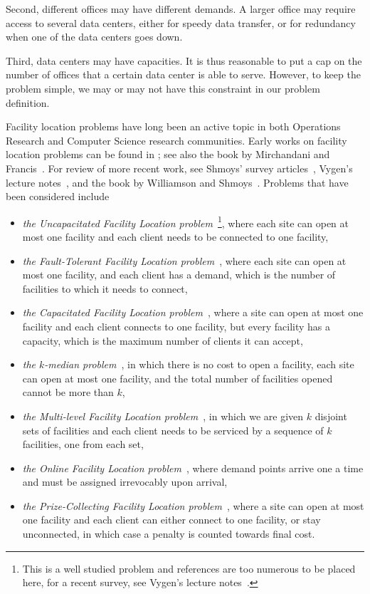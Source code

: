 \documentclass[oneside,final]{ucr}
\begin{document}
Second, different offices may have different demands. A
larger office may require access to several data centers,
either for speedy data transfer, or for redundancy when one
of the data centers goes down.

Third, data centers may have capacities. It is thus
reasonable to put a cap on the number of offices that a
certain data center is able to serve. However, to keep the
problem simple, we may or may not have this constraint in
our problem definition.

Facility location problems have long been an active topic in
both Operations Research and Computer Science research
communities. Early works on facility location problems can
be found in \cite{KuehnH63,Man64,Bal66}; see also the book
by Mirchandani and Francis~\cite{MirF90}. For review of more
recent work, see Shmoys' survey
articles~\cite{Shmoys00,Shmoys04}, Vygen's lecture
notes~\cite{Vygen05}, and the book by Williamson and
Shmoys~\cite{WilliamsonS11}. Problems that have been
considered include
\begin{itemize}
\item \emph{the Uncapacitated Facility Location
    problem}~\footnote{This is a well studied problem and
    references are too numerous to be placed here, for a
    recent survey, see Vygen's lecture
    notes~\cite{Vygen05}.}, where each site can open at most
  one facility and each client needs to be connected to one
  facility,
\item \emph{the Fault-Tolerant Facility Location
    problem}~\cite{JainV03,GuhaMM03,ByrkaSS10}, where each
  site can open at most one facility, and each client has a
  demand, which is the number of facilities to which it
  needs to connect,
\item \emph{the Capacitated Facility Location
    problem}~\cite{ShmoysTA97,MahdianYZ06,PalTW01,ZhangCY05},
  where a site can open at most one facility and each client
  connects to one facility, but every facility has a
  capacity, which is the maximum number of clients it can
  accept,
\item \emph{the $k$-median
    problem}~\cite{CharikarGTS02,JainV01,AryaGKMMP04,CharikarL12},
  in which there is no cost to open a facility, each site
  can open at most one facility, and the total number of
  facilities opened cannot be more than $k$,
\item \emph{the Multi-level Facility Location
    problem}~\cite{AardalMLQ96,AardalCS99,Zhang06,ByrkaR12,KrishnaswamyS12},
  in which we are given $k$ disjoint sets of facilities and
  each client needs to be serviced by a sequence of $k$
  facilities, one from each set,
\item \emph{the Online Facility Location
    problem}~\cite{Meyerson01, Fotakis07, Fotakis08}, where demand points
  arrive one a time and must be assigned irrevocably upon
  arrival,
\item \emph{the Prize-Collecting Facility Location
    problem}~\cite{CharikarKMN01}, where a site can open at
  most one facility and each client can either connect to
  one facility, or stay unconnected, in which case a penalty
  is counted towards final cost.
\end{itemize}
\end{document}
